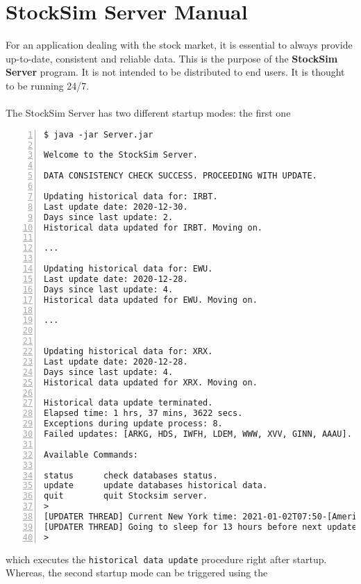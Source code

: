 \chapter{StockSim Server Manual}
For an application dealing with the stock market, it is essential to 
always provide up-to-date, consistent and reliable data. This is the purpose of 
the \textbf{StockSim Server} program. It is not intended to be distributed to 
end users. It is thought to be running 24/7.\\
\\
The StockSim Server has two different startup modes: the first one
\begin{lstlisting}[basicstyle=\footnotesize\ttfamily,language={},numbers=left,
numberstyle=\footnotesize,numbersep=8pt,frame=single]
$ java -jar Server.jar

Welcome to the StockSim Server.

DATA CONSISTENCY CHECK SUCCESS. PROCEEDING WITH UPDATE.

Updating historical data for: IRBT.
Last update date: 2020-12-30.
Days since last update: 2.
Historical data updated for IRBT. Moving on.

...

Updating historical data for: EWU.
Last update date: 2020-12-28.
Days since last update: 4.
Historical data updated for EWU. Moving on.

...


Updating historical data for: XRX.
Last update date: 2020-12-28.
Days since last update: 4.
Historical data updated for XRX. Moving on.

Historical data update terminated.
Elapsed time: 1 hrs, 37 mins, 3622 secs.
Exceptions during update process: 8.
Failed updates: [ARKG, HDS, IWFH, LDEM, WWW, XVV, GINN, AAAU].

Available Commands:

status		check databases status.
update		update databases historical data.
quit		quit Stocksim server.
> 
[UPDATER THREAD] Current New York time: 2021-01-02T07:50-[America/New_York]
[UPDATER THREAD] Going to sleep for 13 hours before next update.
> 
\end{lstlisting}
which executes the \texttt{historical data update} procedure right after
startup. Whereas, the second startup mode can be triggered using the
